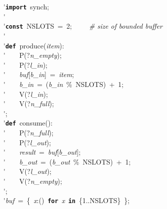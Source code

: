 \'\>\texttt{\textbf{import}}~synch;\\

\'\>\\

\'\>\texttt{\textbf{const}}~NSLOTS~=~2;~~~~~\emph{\# size of bounded buffer}\\

\'\>\\

\'\>\texttt{\textbf{def}}~produce(\textit{item}):\\

\'\>~~~~P(?\textit{n\_empty});\\

\'\>~~~~P(?\textit{l\_in});\\

\'\>~~~~\textit{buf}[\textit{b\_in}]~=~\textit{item};\\

\'\>~~~~\textit{b\_in}~=~(\textit{b\_in}~\%~NSLOTS)~+~1;\\

\'\>~~~~V(?\textit{l\_in});\\

\'\>~~~~V(?\textit{n\_full});\\

\'\>;\\

\'\>\texttt{\textbf{def}}~consume():\\

\'\>~~~~P(?\textit{n\_full});\\

\'\>~~~~P(?\textit{l\_out});\\

\'\>~~~~\textit{result}~=~\textit{buf}[\textit{b\_out}];\\

\'\>~~~~\textit{b\_out}~=~(\textit{b\_out}~\%~NSLOTS)~+~1;\\

\'\>~~~~V(?\textit{l\_out});\\

\'\>~~~~V(?\textit{n\_empty});\\

\'\>;\\

\'\>\textit{buf}~=~\{~\textit{x}:()~\texttt{\textbf{for}}~\textit{x}~\texttt{\textbf{in}}~\{1..NSLOTS\}~\};\\

